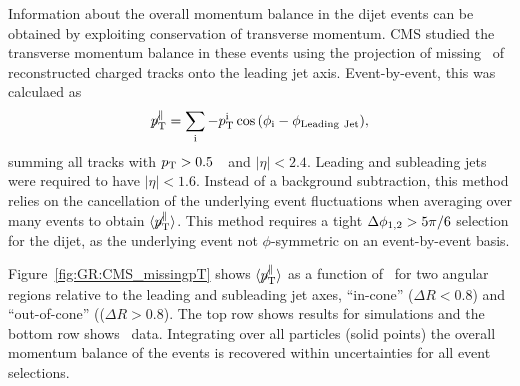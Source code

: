 Information about the overall momentum balance in the dijet events can be obtained by exploiting
conservation of transverse momentum. CMS studied the transverse momentum balance in these events
using the projection of missing \pt\ of reconstructed charged tracks onto the leading jet axis. 
Event-by-event, this was calculaed as 
\begin{equation}
\displaystyle{\not} p_{\mathrm{T}}^{\parallel} =
\sum_{\rm i}{ -p_{\mathrm{T}}^{\rm i}\cos{(\phi_{\rm i}-\phi_{\rm Leading\ Jet})}},
\end{equation}
summing all tracks with $p_{\rm{T}} > 0.5$~\GeVc\ and $|\eta| < 2.4$. 
Leading and subleading jets were required to have $|\eta| < 1.6$.
Instead of a background subtraction, this method relies on the cancellation of the 
underlying event fluctuations when averaging over many events to obtain 
$\langle \displaystyle{\not} p_{\mathrm{T}}^{\parallel} \rangle$.
This method requires a tight $\Delta\phi_{1,2} > 5 \pi/6$ selection for the dijet, as the underlying 
event not $\phi$-symmetric on an event-by-event basis.

Figure~\ref{fig:GR:CMS_missingpT} shows $\langle \displaystyle{\not} p_{\mathrm{T}}^{\parallel} \rangle$
as a function of \AJ\ for two angular regions relative to the leading and subleading 
jet axes, ``in-cone'' ($\Delta R < 0.8$) and ``out-of-cone'' (($\Delta R > 0.8$). 
The top row shows results for  {} simulations and the bottom row shows
\PbPb\ data. Integrating over all particles (solid points) the overall momentum balance of the events
is recovered within uncertainties for all event selections.

